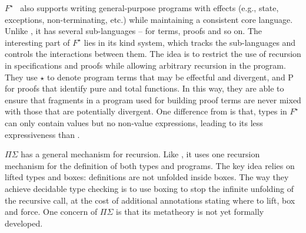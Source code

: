 \begin{comment}
As discussed in \S\ref{sec:rec}, bringing general
recursion blindly into the dependently typed world causes more trouble
than convenience. There are many dependently typed languages that
allow general recursion. Zombie approaches general recursion by
separating a consistent sub-language, in which all expressions are
known to terminate, from a programmatic language that supports general
recursion. What is interesting about Zombie is that those two
seemingly conflicting worlds can interact with each other nicely,
without compromising the consistency property. The key idea of this is
to distinguish between these two fragments by using a
\emph{consistency classifier $\theta$}. When $\theta$ is \textsf{L},
it means the logical part, and \textsf{P} the program part. Like
\name, Zombie uses \textsf{roll} and \textsf{unroll} for iso-recursive
types. To ensure normalization (in order for decidable type checking),
it forbids the use of \textsf{unroll} in \textsf{P}, where the
potential non-termination could arise.\bruno{Zombie is being discussed
in two different places.}
\end{comment}

$F^{\star}$~\cite{Swamy2011} also supports writing general-purpose
programs with effects (e.g., state, exceptions, non-terminating, etc.)
while maintaining a consistent core language. Unlike \name, it has
several sub-languages -- for terms, proofs and so on. The interesting
part of $F^{\star}$ lies in its kind system, which tracks the
sub-languages and controls the interactions between them. The idea is
to restrict the use of recursion in specifications and proofs while
allowing arbitrary recursion in the program. They use $\star$ to
denote program terms that may be effectful and divergent, and
\textsf{P} for proofs that identify pure and total functions. In this
way, they are able to ensure that fragments in a program used for
building proof terms are never mixed with those that are potentially
divergent. One difference from \name is that, types in $F^{\star}$ can
only contain values but no non-value expressions, leading to its less
expressiveness than \name.

$\Pi\Sigma$ has a general mechanism for recursion. Like \name, it uses
one recursion mechanism for the definition of both types and
programs. The key idea relies on lifted types and boxes: definitions
are not unfolded inside boxes. The way they achieve decidable type
checking is to use boxing to stop the infinite unfolding of the
recursive call, at the cost of additional annotations stating where to
lift, box and force. One concern of $\Pi\Sigma$ is that its metatheory
is not yet formally developed.

